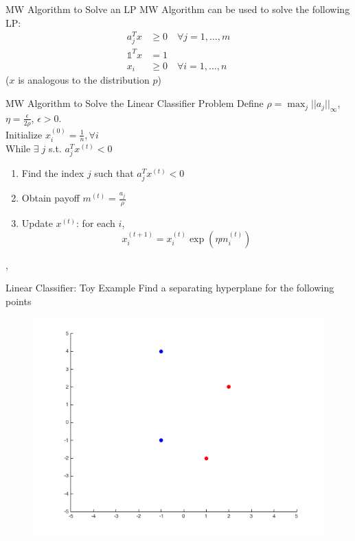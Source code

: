 \documentclass{beamer}
\begin{document}
\begin{frame}{MW Algorithm to Solve an LP}
MW Algorithm can be used to solve the following LP:
\begin{align*}
a_j^Tx &\geq 0 \quad \forall j = 1,\ldots,m \\
\mathds{1}^Tx &= 1 \\
x_i &\geq 0 \quad \forall i = 1,\ldots,n
\end{align*}
($x$ is analogous to the distribution $p$)\\
\end{frame}

\begin{frame}{MW Algorithm to Solve the Linear Classifier Problem}
Define $\rho = \max_j ||a_j||_\infty$, $\eta = \frac{\epsilon}{2\rho}$, $\epsilon > 0$. \\ \vspace{.5cm}
Initialize $x_i^{(0)} = \frac{1}{n}, \forall i$\\ \vspace{.5cm}
While $\exists \; j$ s.t. $a_j^T x^{(t)} < 0$
\begin{enumerate}
\setlength\itemsep{1.2em}
\item Find the index $j$ such that $a_j^Tx^{(t)} <0$
\item Obtain payoff $m^{(t)} = \frac{a_j}{\rho}$
\item Update $x^{(t)}$: for each $i$,
$$ x_i^{(t+1)} = x_i^{(t)}\exp(\eta m_i^{(t)})$$
\end{enumerate}
,\end{frame}

\begin{frame}{Linear Classifier: Toy Example}
Find a separating hyperplane for the following points
\begin{figure}
\includegraphics[width=\textwidth]{ClassifierToy_scatter.png}
\end{figure}
\end{frame}
\end{document}
